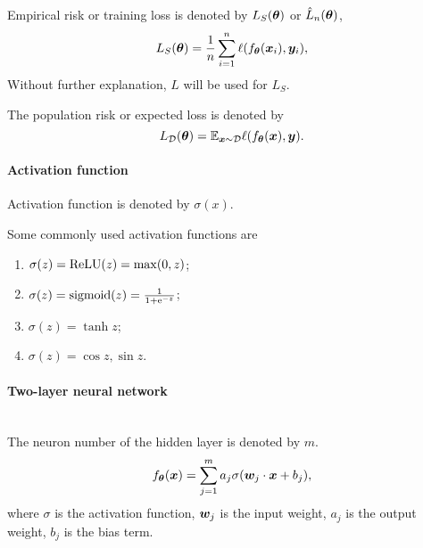 \documentclass[]{article}
\begin{document}
Empirical risk or training loss is denoted by   $L_S(\bm{\theta})$ or $\hat{L}_{n}(\bm{\theta})$,
\begin{equation}
    L_S(\bm{\theta}) =\frac{1}{n}\sum_{i=1}^n\ell(f_{\bm{\theta}}(\bm{x}_i),\bm{y}_i),
\end{equation}
Without further explanation, $L$ will be used for $L_S$.

The population risk or expected loss is denoted by
\begin{equation}
    L_{\mathcal{D}}(\bm{\theta}) =\mathbb{E}_{\bm{x}\sim\mathcal{D}}\ell(f_{\bm{\theta}}(\bm{x}),\bm{y}).
\end{equation}





\paragraph{Activation function}
Activation function is denoted by $\sigma(x)$. 
\begin{exam}Some commonly used activation functions are~\\
    \begin{enumerate}
        \item $\sigma(z) = \mathrm{ReLU} (z) = \max (0, z)$;
        \item $\sigma(z) ={\rm sigmoid}(z)= \frac{1}{1 + \mathrm{e}^{-z}}$;
        \item $\sigma(z) = \tanh z$;
        \item $\sigma(z) = \cos z, \sin z$.
    \end{enumerate}
\end{exam}


\paragraph{Two-layer neural network}~\\
The neuron number of the hidden layer is denoted by $m$.
\begin{equation}
    f_{\bm{\theta}}(\bm{x})=\sum_{j=1}^{m} a_j \sigma (\bm{w}_j\cdot \bm{x} + b_j),
\end{equation}
where $\sigma$ is the activation function, $\bm{w}_j$ is the input weight, $a_j$ is the output weight, $b_j$ is the bias term.
\end{document}
